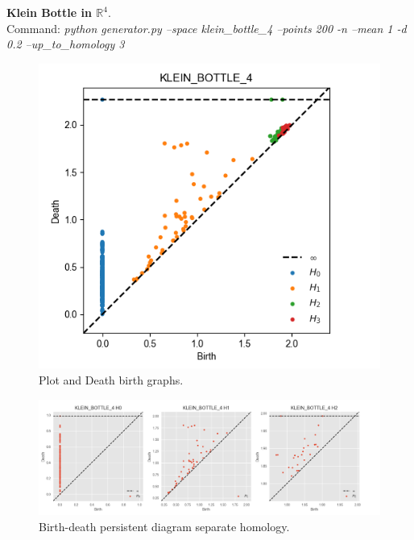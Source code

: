 \documentclass[11pt,a4paper]{report}
\begin{document}
              \textbf{Klein Bottle in $\mathbb{R}^4$}.\\
              Command: \textit{python generator.py --space klein\_bottle\_4 --points 200 -n --mean 1 -d 0.2 --up\_to\_homology 3}

              \begin{figure}[H]
                \centering
                \includegraphics[width=\linewidth]{./ripser/on_klein4.png}
                \caption{Plot and Death birth graphs.}
                \label{fig:sep hom}
              \end{figure}

              \begin{figure}[H]
                \centering
                \includegraphics[width=\linewidth]{./ripser/on_klein4_sep.png}
                \caption{Birth-death persistent diagram separate homology.}
                \label{fig:sep hom}
              \end{figure}
\end{document}
